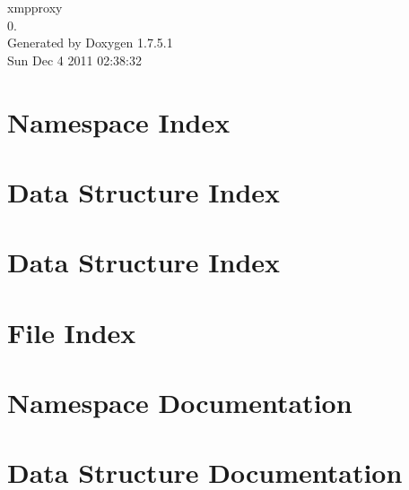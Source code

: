\documentclass[a4paper]{book}
\begin{document}
\hypersetup{pageanchor=false,citecolor=blue}
\begin{titlepage}
\vspace*{7cm}
\begin{center}
{\Large xmpproxy \\[1ex]\large 0. }\\
\vspace*{1cm}
{\large \-Generated by Doxygen 1.7.5.1}\\
\vspace*{0.5cm}
{\small Sun Dec 4 2011 02:38:32}\\
\end{center}
\end{titlepage}
\clearemptydoublepage
{}
\tableofcontents
\clearemptydoublepage
{}
\hypersetup{pageanchor=true,citecolor=blue}
\chapter{\-Namespace \-Index}

\chapter{\-Data \-Structure \-Index}

\chapter{\-Data \-Structure \-Index}

\chapter{\-File \-Index}

\chapter{\-Namespace \-Documentation}










\chapter{\-Data \-Structure \-Documentation}




















\end{document}

